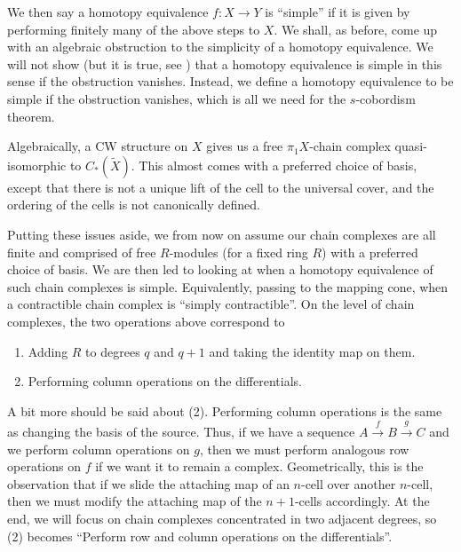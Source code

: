 \documentclass[a4paper, 12pt]{article}
\theoremstyle{definition}
\begin{document}
We then say a homotopy equivalence $f: X \to Y$ is ``simple'' if it is given by performing finitely many of the above steps to $X$. We shall, as before, come up with an algebraic obstruction to the simplicity of a homotopy equivalence. We will not show (but it is true, see \cite[Chapter 13]{whitehead-torsion-source}) that a homotopy equivalence is simple in this sense if the obstruction vanishes. Instead, we define a homotopy equivalence to be simple if the obstruction vanishes, which is all we need for the $s$-cobordism theorem.

Algebraically, a CW structure on $X$ gives us a free $\pi_1X$-chain complex quasi-isomorphic to $C_*(\tilde{X})$. This almost comes with a preferred choice of basis, except that there is not a unique lift of the cell to the universal cover, and the ordering of the cells is not canonically defined.

Putting these issues aside, we from now on assume our chain complexes are all finite and comprised of free $R$-modules (for a fixed ring $R$) with a preferred choice of basis. We are then led to looking at when a homotopy equivalence of such chain complexes is simple. Equivalently, passing to the mapping cone, when a contractible chain complex is ``simply contractible''. On the level of chain complexes, the two operations above correspond to
\begin{enumerate}
  \item Adding $R$ to degrees $q$ and $q + 1$ and taking the identity map on them.
  \item Performing column operations on the differentials.
\end{enumerate}
A bit more should be said about (2). Performing column operations is the same as changing the basis of the source. Thus, if we have a sequence $A \overset{f}{\to} B \overset{g}{\to} C$ and we perform column operations on $g$, then we must perform analogous row operations on $f$ if we want it to remain a complex. Geometrically, this is the observation that if we slide the attaching map of an $n$-cell over another $n$-cell, then we must modify the attaching map of the $n+1$-cells accordingly. At the end, we will focus on chain complexes concentrated in two adjacent degrees, so (2) becomes ``Perform row and column operations on the differentials''.
\end{document}
